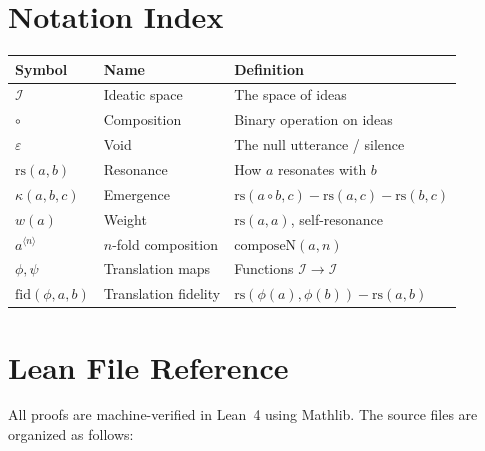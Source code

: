 \documentclass[11pt,oneside]{book}
\theoremstyle{plain}
\theoremstyle{definition}
\theoremstyle{remark}
\newcommand{\rs}{\mathrm{rs}}
\newcommand{\emerge}{\kappa}
\newcommand{\compose}{\circ}
\newcommand{\void}{\varepsilon}
\newcommand{\IS}{\mathcal{I}}
\begin{document}
\vspace{2em}

\chapter*{Notation Index}

\begin{tabular}{lll}
\textbf{Symbol} & \textbf{Name} & \textbf{Definition} \\
\hline
$\IS$ & Ideatic space & The space of ideas \\
$\compose$ & Composition & Binary operation on ideas \\
$\void$ & Void & The null utterance / silence \\
$\rs(a, b)$ & Resonance & How $a$ resonates with $b$ \\
$\emerge(a, b, c)$ & Emergence & $\rs(a \compose b, c) - \rs(a, c) - \rs(b, c)$ \\
$w(a)$ & Weight & $\rs(a, a)$, self-resonance \\
$a^{\langle n \rangle}$ & $n$-fold composition & $\mathrm{composeN}(a, n)$ \\
$\phi, \psi$ & Translation maps & Functions $\IS \to \IS$ \\
$\mathrm{fid}(\phi, a, b)$ & Translation fidelity & $\rs(\phi(a), \phi(b)) - \rs(a, b)$ \\
\end{tabular}

\vspace{2em}

\chapter*{Lean File Reference}

All proofs are machine-verified in Lean~4 using Mathlib. The source files are
organized as follows:
\end{document}
